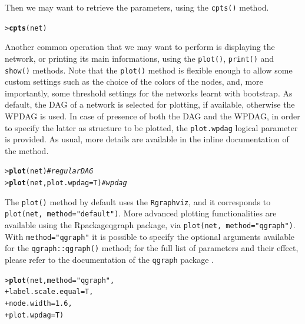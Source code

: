 \documentclass{article}\usepackage[]{graphicx}\usepackage[]{color}
\makeatletter
\newcommand{\hlnum}[1]{\textcolor[rgb]{0.686,0.059,0.569}{#1}}%
\newcommand{\hlstr}[1]{\textcolor[rgb]{0.192,0.494,0.8}{#1}}%
\newcommand{\hlcom}[1]{\textcolor[rgb]{0.678,0.584,0.686}{\textit{#1}}}%
\newcommand{\hlstd}[1]{\textcolor[rgb]{0.345,0.345,0.345}{#1}}%
\newcommand{\hlkwc}[1]{\textcolor[rgb]{0.333,0.667,0.333}{#1}}%
\newcommand{\hlkwd}[1]{\textcolor[rgb]{0.737,0.353,0.396}{\textbf{#1}}}%
\newenvironment{kframe}{%
 \def\at@end@of@kframe{}%
 \ifinner\ifhmode%
  \def\at@end@of@kframe{\end{minipage}}%
  \begin{minipage}{\columnwidth}%
 \fi\fi%
 \def\FrameCommand##1{\hskip\@totalleftmargin \hskip-\fboxsep
 \colorbox{shadecolor}{##1}\hskip-\fboxsep
     \hskip-\linewidth \hskip-\@totalleftmargin \hskip\columnwidth}%
 \MakeFramed {\advance\hsize-\width
   \@totalleftmargin\z@ \linewidth\hsize
   \@setminipage}}%
 {\par\unskip\endMakeFramed%
 \at@end@of@kframe}
\newenvironment{knitrout}{}{} %
\newcommand{\Rpackage}[1]{{\texttt{#1}}}
\newcommand{\Rmethod}[1]{{\texttt{#1}}}
\newcommand{\Rfunarg}[1]{{\texttt{#1}}}
\makeatother
\begin{document}
Then we may want to retrieve the parameters, using the \Rmethod{cpts()} method.
\begin{knitrout}
\color{fgcolor}\begin{kframe}
\begin{alltt}
\hlstd{> }\hlkwd{cpts}\hlstd{(net)}
\end{alltt}
\end{kframe}
\end{knitrout}

Another common operation that we may want to perform is displaying the network, or printing its main informations, using the
\Rmethod{plot()}, \Rmethod{print()} and \Rmethod{show()} methods. Note that the \Rmethod{plot()} method is flexible enough to allow 
some custom settings such as the choice of the colors of the nodes, and, more importantly, some threshold settings 
for the networks learnt with bootstrap. As default, the DAG of a network is selected for plotting, if available,
otherwise the WPDAG is used. In case of presence of both the DAG and the WPDAG, in order to specify the latter as
structure to be plotted, the \Rfunarg{plot.wpdag} logical parameter is provided. As usual, more details are available
in the inline documentation of the method.
\begin{knitrout}
\color{fgcolor}\begin{kframe}
\begin{alltt}
\hlstd{> }\hlkwd{plot}\hlstd{(net)} \hlcom{# regular DAG}
\hlstd{> }\hlkwd{plot}\hlstd{(net,} \hlkwc{plot.wpdag}\hlstd{=T)} \hlcom{# wpdag}
\end{alltt}
\end{kframe}
\end{knitrout}

The \Rmethod{plot()} method by default uses the \Rpackage{Rgraphviz}, and it corresponds to
\Rmethod{plot(net, method="default")}. More advanced plotting functionalities are available
using the Rpackage{qgraph} package, via \Rmethod{plot(net, method="qgraph")}. With
\Rfunarg{method="qgraph"} it is possible to specify the optional arguments available for the
\Rmethod{qgraph::qgraph()} method; for the full list of parameters and their effect, please
refer to the documentation of the \Rpackage{qgraph} package \cite{epskampqgraph}.
\begin{knitrout}
\color{fgcolor}\begin{kframe}
\begin{alltt}
\hlstd{> }\hlkwd{plot}\hlstd{(net,} \hlkwc{method}\hlstd{=}\hlstr{"qgraph"}\hlstd{,}
\hlstd{+ }          \hlkwc{label.scale.equal}\hlstd{=T,}
\hlstd{+ }          \hlkwc{node.width} \hlstd{=} \hlnum{1.6}\hlstd{,}
\hlstd{+ }          \hlkwc{plot.wpdag}\hlstd{=T)}
\end{alltt}
\end{kframe}
\end{knitrout}
\end{document}
